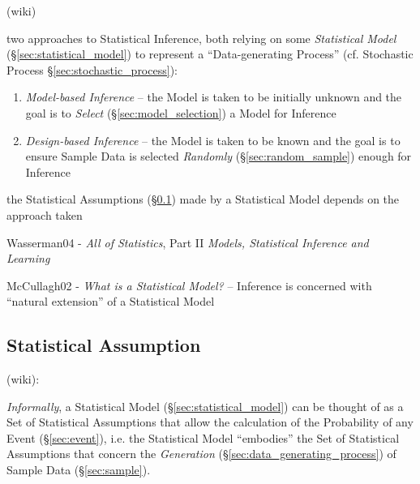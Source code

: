 (wiki)

two approaches to Statistical Inference, both relying on some \emph{Statistical
  Model} (\S\ref{sec:statistical_model}) to represent a ``Data-generating
Process'' (cf. Stochastic Process \S\ref{sec:stochastic_process}):
\begin{enumerate}
  \item \emph{Model-based Inference} -- the Model is taken to be initially
    unknown and the goal is to \emph{Select} (\S\ref{sec:model_selection}) a
    Model for Inference
  \item \emph{Design-based Inference} -- the Model is taken to be known and the
    goal is to ensure Sample Data is selected \emph{Randomly}
    (\S\ref{sec:random_sample}) enough for Inference
\end{enumerate}
the Statistical Assumptions (\S\ref{sec:statistical_assumption}) made by a
Statistical Model depends on the approach taken

Wasserman04 - \emph{All of Statistics}, Part II \emph{Models, Statistical
  Inference and Learning}

McCullagh02 - \emph{What is a Statistical Model?} -- Inference is concerned with
``natural extension'' of a Statistical Model



\subsection{Statistical Assumption}\label{sec:statistical_assumption}

(wiki):

\emph{Informally}, a Statistical Model (\S\ref{sec:statistical_model}) can be
thought of as a Set of Statistical Assumptions that allow the calculation of the
Probability of any Event (\S\ref{sec:event}), i.e. the Statistical Model
``embodies'' the Set of Statistical Assumptions that concern the
\emph{Generation} (\S\ref{sec:data_generating_process}) of Sample Data
(\S\ref{sec:sample}).


